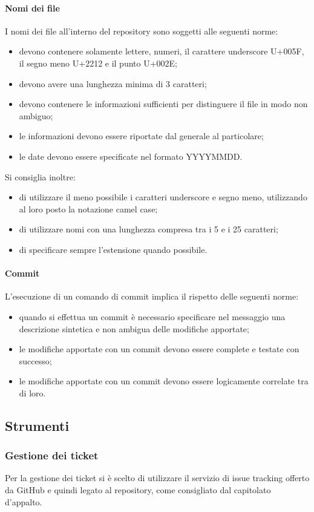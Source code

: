 			\paragraph{Nomi dei file}
				I nomi dei file all’interno del repository sono soggetti alle seguenti norme:
				\begin{itemize}
					\item devono contenere solamente lettere, numeri, il carattere underscore U+005F, il segno meno U+2212 e il punto U+002E;
					\item devono avere una lunghezza minima di 3 caratteri;
					\item devono contenere le informazioni sufficienti per distinguere il file in modo non ambiguo;
					\item le informazioni devono essere riportate dal generale al particolare;
					\item le date devono essere specificate nel formato YYYYMMDD.
				\end{itemize}
				Si consiglia inoltre:
				\begin{itemize}
					\item di utilizzare il meno possibile i caratteri underscore e segno meno, utilizzando al loro posto la notazione camel case;
					\item di utilizzare nomi con una lunghezza compresa tra i 5 e i 25 caratteri;
					\item di specificare sempre l’estensione quando possibile.
				\end{itemize}
			\paragraph{Commit}
				L'esecuzione di un comando di commit implica il rispetto delle seguenti norme:
				\begin{itemize}
					\item quando si effettua un commit è necessario specificare nel messaggio una descrizione sintetica e non ambigua delle modifiche apportate;
					\item le modifiche apportate con un commit devono essere complete e testate con successo;
					\item le modifiche apportate con un commit devono essere logicamente correlate tra di loro.
				\end{itemize}
	\subsection{Strumenti}
		\subsubsection{Gestione dei ticket}
			Per la gestione dei ticket si è scelto di utilizzare il servizio di issue tracking offerto da GitHub e quindi legato al repository, come consigliato dal capitolato d’appalto.